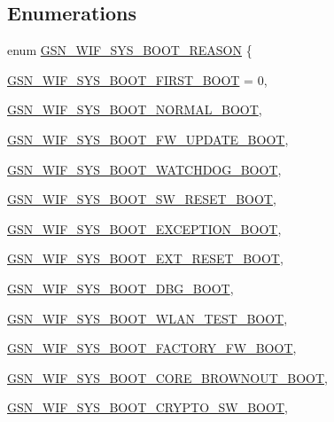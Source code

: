 \subsection*{Enumerations}
\begin{DoxyCompactItemize}
\item 
enum \hyperlink{a00639_ga36af0a76d3b3d7cad5c5dd1f60c39091}{GSN\_\-WIF\_\-SYS\_\-BOOT\_\-REASON} \{ \par
\hyperlink{a00639_gga36af0a76d3b3d7cad5c5dd1f60c39091ac285fff9dba8dc2ba60fdacd33619829}{GSN\_\-WIF\_\-SYS\_\-BOOT\_\-FIRST\_\-BOOT} =  0, 
\par
\hyperlink{a00639_gga36af0a76d3b3d7cad5c5dd1f60c39091aeb9feea283c362b0c0e9d78bb5762bb2}{GSN\_\-WIF\_\-SYS\_\-BOOT\_\-NORMAL\_\-BOOT}, 
\par
\hyperlink{a00639_gga36af0a76d3b3d7cad5c5dd1f60c39091a398f4e2af9200a6c92a0e5efdbfa72bd}{GSN\_\-WIF\_\-SYS\_\-BOOT\_\-FW\_\-UPDATE\_\-BOOT}, 
\par
\hyperlink{a00639_gga36af0a76d3b3d7cad5c5dd1f60c39091a00a2ab01a491601e24d1609e84d51f50}{GSN\_\-WIF\_\-SYS\_\-BOOT\_\-WATCHDOG\_\-BOOT}, 
\par
\hyperlink{a00639_gga36af0a76d3b3d7cad5c5dd1f60c39091a4a77c0d04ab7ee1c0aeb06b46bf3127c}{GSN\_\-WIF\_\-SYS\_\-BOOT\_\-SW\_\-RESET\_\-BOOT}, 
\par
\hyperlink{a00639_gga36af0a76d3b3d7cad5c5dd1f60c39091a57c1bc088be599019fbc84f6a8691480}{GSN\_\-WIF\_\-SYS\_\-BOOT\_\-EXCEPTION\_\-BOOT}, 
\par
\hyperlink{a00639_gga36af0a76d3b3d7cad5c5dd1f60c39091a091d2c23baba77524f56e8160707ea37}{GSN\_\-WIF\_\-SYS\_\-BOOT\_\-EXT\_\-RESET\_\-BOOT}, 
\par
\hyperlink{a00639_gga36af0a76d3b3d7cad5c5dd1f60c39091a1bf68122c5be8c2214712adf99074a86}{GSN\_\-WIF\_\-SYS\_\-BOOT\_\-DBG\_\-BOOT}, 
\par
\hyperlink{a00639_gga36af0a76d3b3d7cad5c5dd1f60c39091a56db5479c0f77a1912d28b8515263fa4}{GSN\_\-WIF\_\-SYS\_\-BOOT\_\-WLAN\_\-TEST\_\-BOOT}, 
\par
\hyperlink{a00639_gga36af0a76d3b3d7cad5c5dd1f60c39091a6ae80cef6eb41a7eaa9581ff6dab4d2d}{GSN\_\-WIF\_\-SYS\_\-BOOT\_\-FACTORY\_\-FW\_\-BOOT}, 
\par
\hyperlink{a00639_gga36af0a76d3b3d7cad5c5dd1f60c39091a69530a2da30366e453bf136a6ef32df0}{GSN\_\-WIF\_\-SYS\_\-BOOT\_\-CORE\_\-BROWNOUT\_\-BOOT}, 
\par
\hyperlink{a00639_gga36af0a76d3b3d7cad5c5dd1f60c39091af069096b1d74063e2a81f51cb9de8d63}{GSN\_\-WIF\_\-SYS\_\-BOOT\_\-CRYPTO\_\-SW\_\-BOOT}, 

\end{DoxyCompactItemize}
